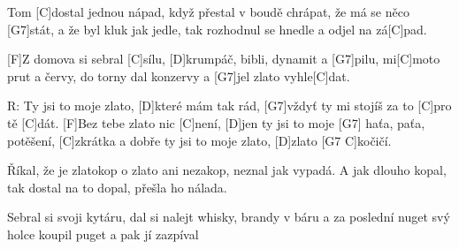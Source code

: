 
Tom [C]dostal jednou nápad,
když přestal v boudě chrápat,
že má se něco [G7]stát, a že byl kluk jak jedle,
tak rozhodnul se hnedle a odjel na zá[C]pad.

[F]Z domova si sebral [C]sílu,
[D]krumpáč, bibli, dynamit a [G7]pilu,
mi[C]moto prut a červy, do torny dal konzervy
a [G7]jel zlato vyhle[C]dat.

R: Ty jsi to moje zlato, [D]které mám tak rád,
[G7]vždyť ty mi stojíš za to [C]pro tě [C]dát.
[F]Bez tebe zlato nic [C]není,
[D]jen ty jsi to moje [G7] haťa, paťa, potěšení,
[C]zkrátka a dobře ty jsi to moje zlato,
[D]zlato [G7 C]kočičí.

Říkal, že je zlatokop o zlato ani nezakop,
neznal jak vypadá. A jak dlouho kopal,
tak dostal na to dopal, přešla ho nálada.

Sebral si svoji kytáru, dal si nalejt whisky,
brandy v báru a za poslední nuget svý holce
koupil puget a pak jí zazpíval